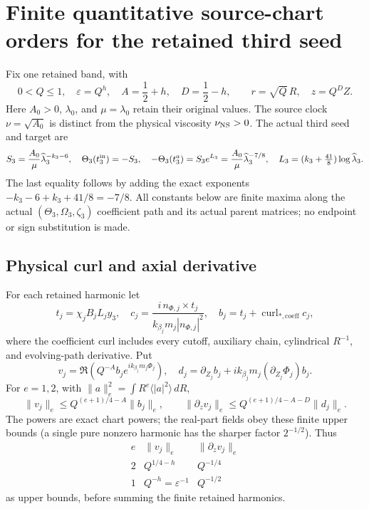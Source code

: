 \section{Finite quantitative source-chart orders for the retained third seed}
\label{qext:setup}
Fix one retained band, with
\[
0<Q\le1,\quad\varepsilon=Q^h,\quad A=\frac12+h,\quad D=\frac12-h,
\qquad r=\sqrt Q\,R,\quad z=Q^D Z .
\]
Here \(A_0>0\), \(\lambda _0\), and \(\mu=\lambda _0\) retain their original
values.  The source clock \(\nu=\sqrt{A_0}\) is distinct from the physical
viscosity \(\nu_{\rm NS}>0\).  The actual third seed and target are
\[
S_3=\frac{A_0}{\mu}\widehat\lambda _3^{-k_3-6},\quad
\Theta_3(t_3^{\rm in})=-S_3,\quad
-\Theta_3(t_3^a)=S_3e^{L_3}
=\frac{A_0}{\mu}\widehat\lambda _3^{-7/8},\quad
L_3=(k_3+\tfrac{41}{8})\log\widehat\lambda _3 .
\]
The last equality follows by adding the exact exponents
\(-k_3-6+k_3+41/8=-7/8\).  All constants below are finite maxima along
the actual \((\Theta_3,\Omega_3,\zeta_3)\) coefficient path and its actual
parent matrices; no endpoint or sign substitution is made.

\subsection{Physical curl and axial derivative}
For each retained harmonic let
\[
t_j=\chi_jB_jL_jy_3,\quad
c_j=\frac{i\,n_{\Phi,j}\times t_j}{k_{\beta_j}m_j|n_{\Phi,j}|^2},\quad
b_j=t_j+\operatorname{curl}_{*,\mathrm{coeff}}c_j,
\]
where the coefficient curl includes every cutoff, auxiliary chain,
cylindrical \(R^{-1}\), and evolving-path derivative.  Put
\[
v_j=\Re(Q^{-A}b_je^{ik_{\beta_j}m_j\Phi_j}),\quad
d_j=\partial_{Z_j}b_j+ik_{\beta_j}m_j(\partial_{Z_j}\Phi_j)b_j .
\]
For \(e=1,2\), with \(\|a\|_e^2=\int R^e\langle|a|^2\rangle\,dR\),
\[
\|v_j\|_e\le Q^{(e+1)/4-A}\|b_j\|_e,\qquad
\|\partial_zv_j\|_e\le Q^{(e+1)/4-A-D}\|d_j\|_e .
\]
The powers are exact chart powers; the real-part fields obey these finite
upper bounds (a single pure nonzero harmonic has the sharper factor
\(2^{-1/2}\)).  Thus
\[
\begin{array}{c|cc}
e&\|v_j\|_e&\|\partial_zv_j\|_e\\ \hline
2&Q^{1/4-h}&Q^{-1/4}\\
1&Q^{-h}=\varepsilon^{-1}&Q^{-1/2}
\end{array}
\]
as upper bounds, before summing the finite retained harmonics.


